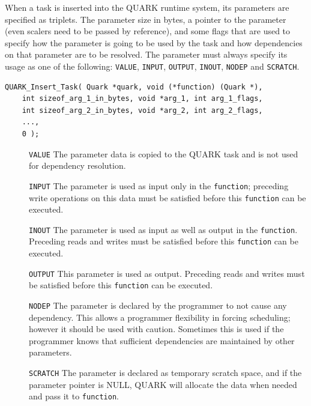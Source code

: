 \documentclass[11pt,letterpaper]{report}
\begin{document}
When a task is inserted into the QUARK runtime system, its parameters
are specified as triplets.  The parameter size in bytes, a pointer to
the parameter (even scalers need to be passed by reference), and some
flags that are used to specify how the parameter is going to be used by
the task and how dependencies on that parameter are to be resolved.
The parameter must always specify its usage as one of the following:
\verb|VALUE|, \verb|INPUT|, \verb|OUTPUT|, \verb|INOUT|, \verb|NODEP|
and \verb|SCRATCH|.
\begin{samepage}
\begin{lstlisting}
QUARK_Insert_Task( Quark *quark, void (*function) (Quark *),
    int sizeof_arg_1_in_bytes, void *arg_1, int arg_1_flags,
    int sizeof_arg_2_in_bytes, void *arg_2, int arg_2_flags,
    ...,
    0 );
\end{lstlisting}
\end{samepage}
\begin{description}
\item[]\verb|VALUE| The parameter data is copied to the QUARK task and
  is not used for dependency resolution.
\item[]\verb|INPUT| The parameter is used as input only in the
  \verb|function|; preceding write operations on this data must be
  satisfied before this \verb|function| can be executed.
\item[]\verb|INOUT| The parameter is used as input as well as output
  in the \verb|function|.  Preceding reads and writes must be
  satisfied before this \verb|function| can be executed.
\item[]\verb|OUTPUT| This parameter is used as output.  Preceding
  reads and writes must be satisfied before this \verb|function| can
  be executed.
\item[]\verb|NODEP| The parameter is declared by the programmer to not
  cause any dependency.  This allows a programmer flexibility in
  forcing scheduling; however it should be used with caution.
  Sometimes this is used if the programmer knows that sufficient
  dependencies are maintained by other parameters.
\item[]\verb|SCRATCH| The parameter is declared as temporary scratch
  space, and if the parameter pointer is NULL, QUARK will allocate the
  data when needed and pass it to \verb|function|.
\end{description}
\end{document}
